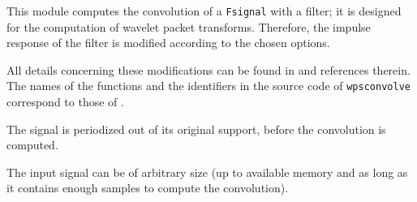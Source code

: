 This module computes the convolution of a \verb+Fsignal+ with a filter;
it is designed for the computation of wavelet packet
transforms. 
Therefore, the impulse response of the filter is modified according to the chosen 
options. 

All details concerning these modifications can be
found in \cite{mallat:wavelet} and references therein. 
The names of the functions and the identifiers in the source code of \verb+wpsconvolve+
correspond to those of \cite{mallat:wavelet}. 

The signal is periodized out of its original support, before the
convolution is computed.

The input signal can be of arbitrary size (up to available memory and as long as it 
contains enough samples to compute the convolution).




